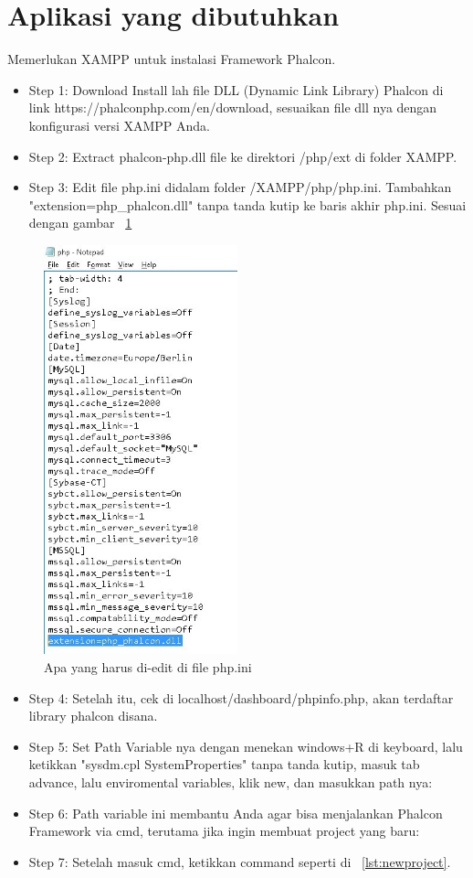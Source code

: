 \documentclass{wileySix}
\begin{document}
\section{Aplikasi yang dibutuhkan}
Memerlukan XAMPP untuk instalasi Framework Phalcon.
\begin{itemize}
 \item Step 1: Download Install lah file DLL (Dynamic Link Library) Phalcon di link https://phalconphp.com/en/download, sesuaikan file dll nya dengan konfigurasi versi XAMPP Anda.
 \item Step 2: Extract phalcon-php.dll file ke direktori /php/ext di folder XAMPP.
 \item Step 3: Edit file php.ini didalam folder /XAMPP/php/php.ini. Tambahkan "extension=php\_phalcon.dll" tanpa tanda kutip ke baris akhir php.ini. Sesuai dengan gambar ~\ref{fig:extension}
\end{itemize}
\begin{figure}[h!]
\centerline{\includegraphics[width=0.5\textwidth]
{figures/extension.JPG}}
\caption{Apa yang harus di-edit di file php.ini}
\label{fig:extension}
\end{figure}
\begin{itemize}
 \item Step 4: Setelah itu, cek di localhost/dashboard/phpinfo.php, akan terdaftar library phalcon disana.
 \item Step 5: Set Path Variable nya dengan menekan windows+R di keyboard, lalu ketikkan "sysdm.cpl SystemProperties" tanpa tanda kutip, masuk tab advance, lalu enviromental variables, klik new, dan masukkan path nya:
 \item Step 6: Path variable ini membantu Anda agar bisa menjalankan Phalcon Framework via cmd, terutama jika ingin membuat project yang baru:
 \item Step 7: Setelah masuk cmd, ketikkan command seperti di ~\ref{lst:newproject}.
 \end{itemize}
\end{document}
